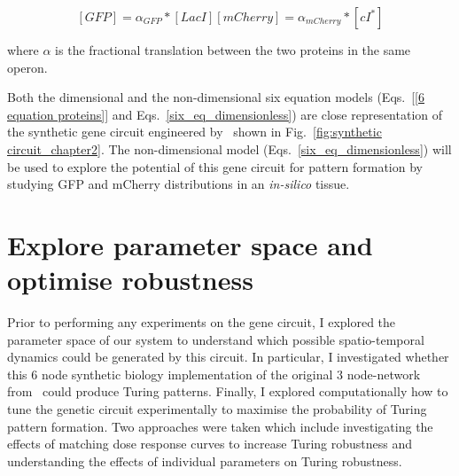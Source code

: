 \begin{subequations}
    \begin{equation}
        [GFP] = \alpha_{GFP}*[LacI]
    \end{equation}
    \begin{equation}
        [mCherry] = \alpha_{mCherry}*[cI^*]
    \end{equation}
    \label{linear_fluorescence}
\end{subequations}

where $\alpha$ is the fractional translation between the two proteins in the same operon.


Both the dimensional and the non-dimensional six equation models (Eqs.~\ref{[6 equation proteins]} and Eqs.~\ref{six_eq_dimensionless}) are close representation of the synthetic gene circuit engineered by~\cite{Tica2020} shown in Fig.~\ref{fig:synthetic circuit_chapter2}.
The non-dimensional model (Eqs.~\ref{six_eq_dimensionless}) will be used to explore the potential of this gene circuit for pattern formation by studying GFP and mCherry distributions in an \textit{in-silico} tissue.



\section{Explore parameter space and optimise robustness}
Prior to performing any experiments on the gene circuit, I explored the parameter space of our system to understand which possible spatio-temporal dynamics could be generated by this circuit.
In particular, I investigated whether this 6 node synthetic biology implementation of the original 3 node-network from~\cite{Scholes2019} could produce Turing patterns.
Finally, I explored computationally how to tune the genetic circuit experimentally to maximise the probability of Turing pattern formation.
Two approaches were taken which include investigating the effects of matching dose response curves to increase Turing robustness and understanding the effects of individual parameters on Turing robustness.

